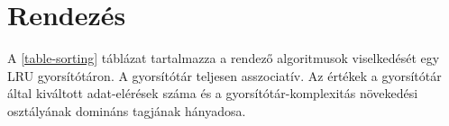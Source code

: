 \documentclass[12pt]{report}
\begin{document}
\section{Rendezés}

A \ref{table-sorting} táblázat tartalmazza
a rendező algoritmusok viselkedését egy LRU gyorsítótáron.
A gyorsítótár teljesen asszociatív.
Az értékek a gyorsítótár által kiváltott adat-elérések száma
és a gyorsítótár-komplexitás növekedési osztályának domináns tagjának hányadosa.

\end{document}

